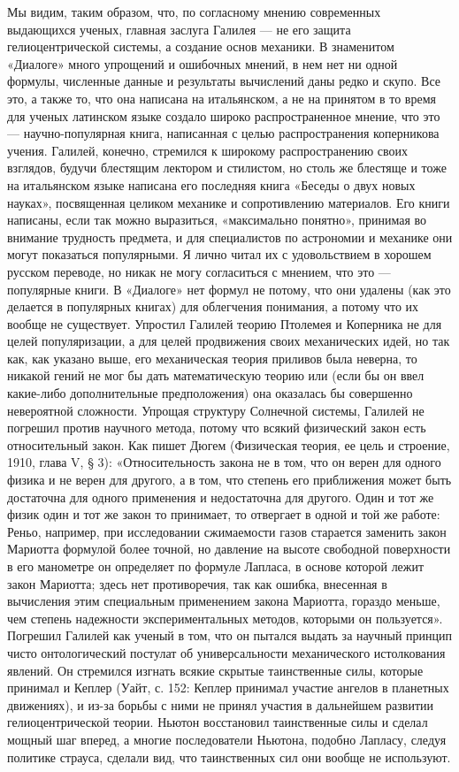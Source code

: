Мы видим, таким образом, что, по согласному мнению современных выдающихся
ученых, главная заслуга Галилея --- не его защита гелиоцентрической системы, а
создание основ механики. В знаменитом «Диалоге» много упрощений и ошибочных
мнений, в нем нет ни одной формулы, численные данные и результаты вычислений
даны редко и скупо. Все это, а также то, что она написана на итальянском, а не
на принятом в то время для ученых латинском языке создало широко
распространенное мнение, что это --- научно-популярная книга, написанная с целью
распространения коперникова учения. Галилей, конечно, стремился к широкому
распространению своих взглядов, будучи блестящим лектором и стилистом, но столь
же блестяще и тоже на итальянском языке написана его последняя книга «Беседы о
двух новых науках», посвященная целиком механике и сопротивлению материалов.
Его книги написаны, если так можно выразиться, «максимально понятно», принимая
во внимание трудность предмета, и для специалистов по астрономии и механике они
могут показаться популярными. Я лично читал их с удовольствием в хорошем
русском переводе, но никак не могу согласиться с мнением, что это --- популярные
книги. В «Диалоге» нет формул не потому, что они удалены (как это делается в
популярных книгах) для облегчения понимания, а потому что их вообще не
существует. Упростил Галилей теорию Птолемея и Коперника не для целей
популяризации, а для целей продвижения своих механических идей, но так как, как
указано выше, его механическая теория приливов была неверна, то никакой гений
не мог бы дать математическую теорию или (если бы он ввел какие-либо
дополнительные предположения) она оказалась бы совершенно невероятной
сложности. Упрощая структуру Солнечной системы, Галилей не погрешил против
научного метода, потому что всякий физический закон есть относительный закон.
Как пишет Дюгем (Физическая теория, ее цель и строение, 1910, глава V, § 3):
«Относительность закона не в том, что он верен для одного физика и не верен для
другого, а в том, что степень его приближения может быть достаточна для одного
применения и недостаточна для другого. Один и тот же физик один и тот же закон
то принимает, то отвергает в одной и той же работе: Реньо, например, при
исследовании сжимаемости газов старается заменить закон Мариотта формулой более
точной, но давление на высоте свободной поверхности в его манометре он
определяет по формуле Лапласа, в основе которой лежит закон Мариотта; здесь нет
противоречия, так как ошибка, внесенная в вычисления этим специальным
применением закона Мариотта, гораздо меньше, чем степень надежности
экспериментальных методов, которыми он пользуется». Погрешил Галилей как ученый
в том, что он пытался выдать за научный принцип чисто онтологический постулат
об универсальности механического истолкования явлений. Он стремился изгнать
всякие скрытые таинственные силы, которые принимал и Кеплер (Уайт, с. 152:
Кеплер принимал участие ангелов в планетных движениях), и из-за борьбы с ними
не принял участия в дальнейшем развитии гелиоцентрической теории. Ньютон
восстановил таинственные силы и сделал мощный шаг вперед, а многие
последователи Ньютона, подобно Лапласу, следуя политике страуса, сделали вид,
что таинственных сил они вообще не используют.

